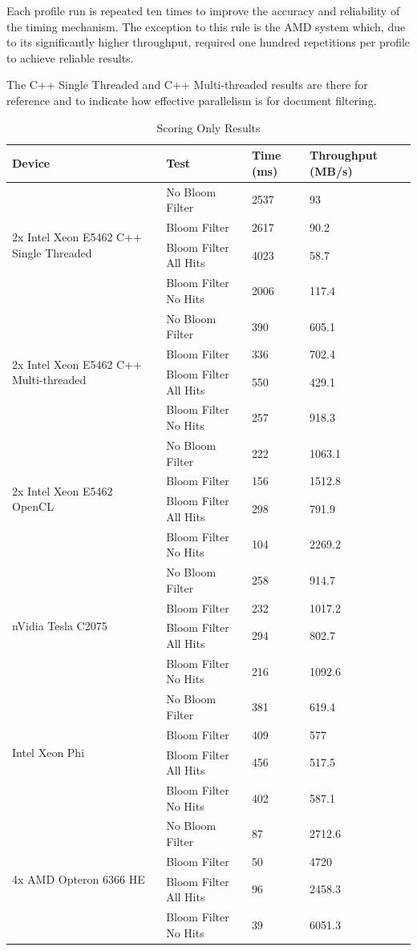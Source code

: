 Each profile run is repeated ten times to improve the accuracy and reliability
of the timing mechanism. The exception to this rule is the AMD system which,
due to its significantly higher throughput, required one hundred repetitions
per profile to achieve reliable results.

The C++ Single Threaded and C++ Multi-threaded results are there for reference
and to indicate how effective parallelism is for document filtering.

\begin{table}[H]
\begin{tabular}{|l|l|l|l|}
\hline
Device & Test & Time (ms) & Throughput (MB/s)\\
\hline
\multirow{4}{*}{2x Intel Xeon E5462 C++ Single Threaded}
& No Bloom Filter & 2537 & 93 \\
& Bloom Filter & 2617 & 90.2 \\
& Bloom Filter All Hits & 4023 & 58.7 \\
& Bloom Filter No Hits & 2006 & 117.4 \\
\hline
\multirow{4}{*}{2x Intel Xeon E5462 C++ Multi-threaded}
& No Bloom Filter & 390 & 605.1 \\
& Bloom Filter & 336 & 702.4 \\
& Bloom Filter All Hits & 550 & 429.1 \\
& Bloom Filter No Hits & 257 & 918.3 \\
\hline
\multirow{4}{*}{2x Intel Xeon E5462 OpenCL}
& No Bloom Filter & 222 & 1063.1 \\
& Bloom Filter & 156 & 1512.8 \\
& Bloom Filter All Hits & 298 & 791.9 \\
& Bloom Filter No Hits & 104 & 2269.2 \\
\hline
\multirow{4}{*}{nVidia Tesla C2075}
& No Bloom Filter & 258 & 914.7 \\
& Bloom Filter & 232 & 1017.2 \\
& Bloom Filter All Hits & 294 & 802.7 \\
& Bloom Filter No Hits & 216 & 1092.6 \\
\hline
\multirow{4}{*}{Intel Xeon Phi}
& No Bloom Filter & 381 & 619.4 \\
& Bloom Filter & 409 & 577 \\
& Bloom Filter All Hits & 456 & 517.5 \\
& Bloom Filter No Hits & 402 & 587.1 \\
\hline
\multirow{4}{*}{4x AMD Opteron 6366 HE}
& No Bloom Filter & 87 & 2712.6 \\
& Bloom Filter & 50 & 4720 \\
& Bloom Filter All Hits & 96 & 2458.3 \\
& Bloom Filter No Hits & 39 & 6051.3 \\
\hline
\end{tabular}
\caption{Scoring Only Results}
\label{table:scoringOnly}
\end{table}

